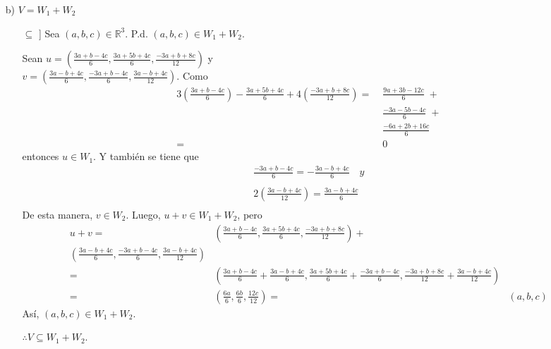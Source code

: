 \documentclass[fleqn]{article}
\begin{document}
\begin{enumerate}
\begin{enumerate}
            \item[b)] $ V = W_1 + W_2 $ \par
            \begin{enumerate}
                \item[$ \subseteq $]] Sea $ (a,b,c) \in \mathbb{R}^3 $. P.d. $ (a,b,c) \in W_1 + W_2 $. \par
                
                Sean $ u = \left( \displaystyle \frac{3a + b - 4c}{6}, \frac{3a + 5b + 4c}{6}, \frac{-3a + b + 8c}{12} \right) $ y \\ $ \displaystyle v = \left(\frac{3a - b + 4c}{6}, \frac{-3a + b - 4c}{6}, \frac{3a - b + 4c}{12} \right) $. Como
                \begin{align*}
                    3 \left(\frac{3a + b - 4c}{6} \right) - \frac{3a + 5b + 4c}{6} + 4 \left(\frac{-3a + b + 8c}{12} \right) = \; & \frac{9a + 3b - 12c}{6} \; + \\ & \frac{-3a - 5b - 4c}{6} \; + \\ & \frac{-6a + 2b + 16c}{6} \\
                    = \; & 0
                \end{align*}
                entonces $ u \in W_1 $. Y también se tiene que
                \begin{align*}
                \frac{-3a + b - 4c}{6} = - \frac{3a - b + 4c}{6} \quad y \\\\
                2 \left( \frac{3a - b + 4c}{12} \right) = \frac{3a - b + 4c}{6} \\
                \end{align*}
                De esta manera, $ v \in W_2 $. Luego, $ u + v \in W_1 + W_2 $, pero
                \begin{align*}
                    u + v =& \left( \displaystyle \frac{3a + b - 4c}{6}, \frac{3a + 5b + 4c}{6}, \frac{-3a + b + 8c}{12} \right) + \\ \left(\frac{3a - b + 4c}{6}, \frac{-3a + b - 4c}{6}, \frac{3a - b + 4c}{12} \right) \\
                    =& \left( \displaystyle \frac{3a + b - 4c}{6} + \frac{3a - b + 4c}{6}, \frac{3a + 5b + 4c}{6} + \frac{-3a + b - 4c}{6}, \frac{-3a + b + 8c}{12} + \frac{3a - b + 4c}{12} \right) \\
                    =& \left( \displaystyle \frac{6a}{6}, \frac{6b}{6}, \frac{12c}{12} \right)
                    =& (a,b,c)
                \end{align*}
                Así, $ (a,b,c) \in W_1 + W_2 $. \par
                $ \therefore V \subseteq W_1 + W_2 $.


\end{enumerate}
\end{enumerate}
\end{enumerate}
\end{document}
